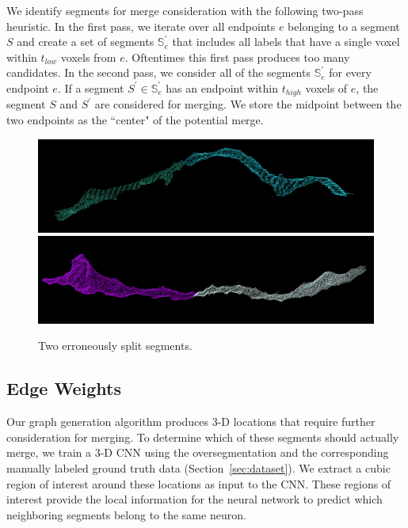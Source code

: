 We identify segments for merge consideration with the following two-pass heuristic.
In the first pass, we iterate over all endpoints $e$ belonging to a segment $S$ and create a set of segments $\mathbb{S}_e^\prime$ that includes all labels that have a single voxel within $t_{low}$ voxels from $e$. 
Oftentimes this first pass produces too many candidates.
In the second pass, we consider all of the segments $\mathbb{S}_e^\prime$ for every endpoint $e$. 
If a segment $S^\prime \in \mathbb{S}_e^\prime$ has an endpoint within $t_{high}$ voxels of $e$, the segment $S$ and $S^\prime$ are considered for merging. 
We store the midpoint between the two endpoints as the ``center" of the potential merge.

\begin{figure}[t]
	\centering
	\includegraphics[width=0.92\linewidth]{./figures/split_error1.png}
	\includegraphics[width=0.92\linewidth]{./figures/split_error2.png}
	\caption{Two erroneously split segments.}
	\label{fig:merge_candidates}
\end{figure}


\subsection{Edge Weights}

Our graph generation algorithm produces 3-D locations that require further consideration for merging. 
To determine which of these segments should actually merge, we train a 3-D CNN using the oversegmentation and the corresponding manually labeled ground truth data (Section~\ref{sec:dataset}).
We extract a cubic region of interest around these locations as input to the CNN. 
These regions of interest provide the local information for the neural network to predict which neighboring segments belong to the same neuron. 

